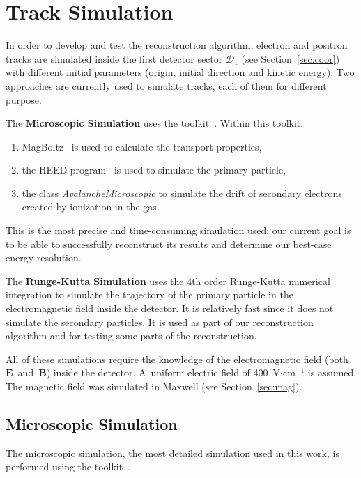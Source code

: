 \chapter{Track Simulation}
	In order to develop and test the reconstruction algorithm, electron and positron tracks are simulated inside the first detector sector $\mathcal{D}_1$ (see Section~\ref{sec:coor}) with different initial parameters (origin, initial direction and kinetic energy). Two approaches are currently used to simulate tracks, each of them for different purpose.
	
	The \textbf{Microscopic Simulation} uses the \garfieldpp toolkit~\cite{Garfield++}. Within this toolkit:
		\begin{enumerate}[nosep,label=\alph*)]
			\item MagBoltz~\cite{magboltz} is used to calculate the transport properties,
			\item the \ac{HEED} program~\cite{HEED} is used to simulate the primary particle,
			\item the class \textit{AvalancheMicroscopic} to simulate the drift of secondary electrons created by ionization in the gas.
		\end{enumerate}
	This is the most precise and time-consuming simulation used; our current goal is to be able to successfully reconstruct its results and determine our best-case energy resolution.
	
	The \textbf{Runge-Kutta Simulation} uses the 4th order Runge-Kutta numerical integration to simulate the trajectory of the primary particle in the electromagnetic field inside the detector. It is relatively fast since it does not simulate the secondary particles. It is used as part of our reconstruction algorithm and for testing some parts of the reconstruction.
	
	All of these simulations require the knowledge of the electromagnetic field (both $\mathbf{E}$~and~$\mathbf{B}$) inside the detector. A~uniform electric field of 400~V$\cdot$cm$^{-1}$ is assumed. The magnetic field was simulated in Maxwell (see Section~\ref{sec:mag}).
	
	\section{Microscopic Simulation}
	\label{sec:microsim}
		The microscopic simulation, the most detailed simulation used in this work, is performed using the \garfieldpp toolkit~\cite{Garfield++}.
		

